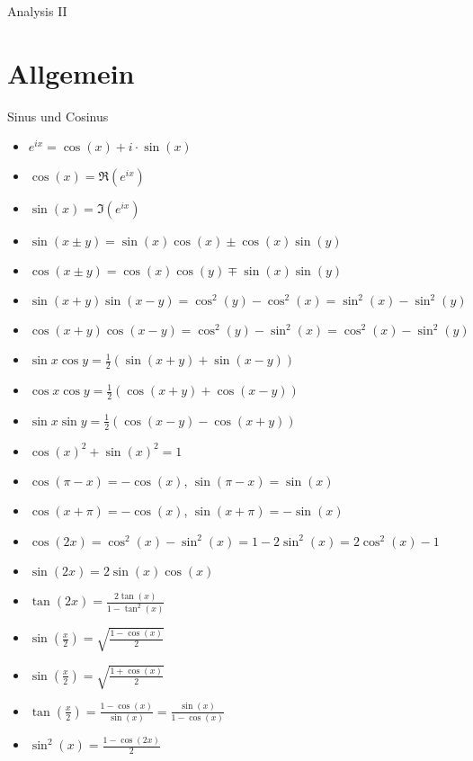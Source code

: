 \begin{center}\begin{Huge}Analysis II\end{Huge}\end{center}

\section{Allgemein}



\begin{Rechenregeln}{Sinus und Cosinus}{}
    \begin{itemize}
    \item $e^{ix} = \cos(x) + i\cdot \sin(x)$
    \item $\cos(x) = \Re(e^{ix})$
    \item $\sin(x) = \Im(e^{ix})$
    \item $\sin(x\pm y) = \sin(x)\cos(x) \pm \cos(x)\sin(y)$ 
    \item $\cos(x\pm y) = \cos(x)\cos(y) \mp \sin(x)\sin(y)$
    \item $\sin(x+y)\sin(x-y) = \cos^2(y) - \cos^2(x) = \sin^2(x) - \sin^2(y)$
    \item $\cos(x+y)\cos(x-y) = \cos^2(y) - \sin^2(x) = \cos^2(x) - \sin^2(y)$
    \item $\sin{x}\cos{y} = \frac{1}{2}(\sin(x+y) + \sin(x-y))$ 
    \item $\cos{x}\cos{y} = \frac{1}{2}(\cos(x+y) + \cos(x-y))$
    \item  $\sin{x}\sin{y} = \frac{1}{2}(\cos(x-y)-\cos(x+y))$
    \item $\cos(x)^2 + \sin(x)^2 = 1$
    \item $\cos(\pi-x) = -\cos(x)$, $\sin(\pi-x) = \sin(x)$
    \item $\cos(x+\pi) = -\cos(x)$, $\sin(x+\pi) = -\sin(x)$
    \item $\cos(2x) = \cos^2(x) - \sin^2(x) = 1-2\sin^2(x) = 2\cos^2(x) - 1$
    \item $\sin(2x) = 2\sin(x)\cos(x)$
    \item $\tan(2x) = \frac{2\tan(x)}{1-\tan^2(x)}$
    \item $\sin(\frac{x}{2}) = \sqrt{\frac{1-\cos(x)}{2}}$
    \item $\sin(\frac{x}{2}) = \sqrt{\frac{1+\cos(x)}{2}}$
    \item $\tan(\frac{x}{2}) = \frac{1-\cos(x)}{\sin(x)} = \frac{\sin(x)}{1-\cos(x)}$
    \item $\sin^2(x) = \frac{1-\cos(2x)}{2}$

\end{itemize}
\end{Rechenregeln}
